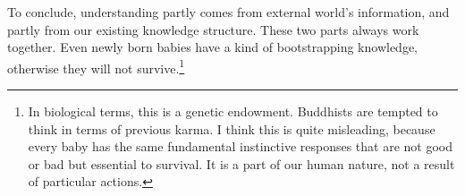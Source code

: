 To conclude, understanding partly comes from external world's information, and partly from our existing knowledge structure. These two parts always work together. Even newly born babies have a kind of bootstrapping knowledge, otherwise they will not survive.\footnote{In biological terms, this is a genetic endowment. Buddhists are tempted to think in terms of previous karma. I think this is quite misleading, because every baby has the same fundamental instinctive responses that are not good or bad but essential to survival. It is a part of our human nature, not a result of particular actions.}
